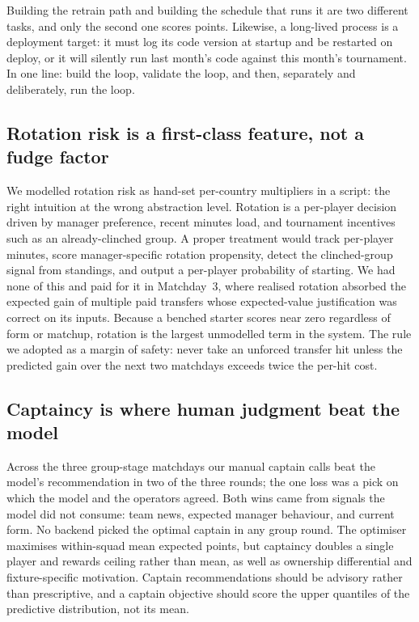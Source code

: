 Building the retrain path and building the schedule that runs it are
two different tasks, and only the second one scores points. Likewise,
a long-lived process is a deployment target: it must log its code
version at startup and be restarted on deploy, or it will silently run
last month's code against this month's tournament. In one line: build
the loop, validate the loop, and then, separately and deliberately,
run the loop.

\subsection{Rotation risk is a first-class feature, not a fudge
factor}
\label{sec:lessons-rotation}

We modelled rotation risk as hand-set per-country multipliers in a
script: the right intuition at the wrong abstraction level. Rotation
is a per-player decision driven by manager preference, recent minutes
load, and tournament incentives such as an already-clinched group. A
proper treatment would track per-player minutes, score
manager-specific rotation propensity, detect the clinched-group signal
from standings, and output a per-player probability of starting. We
had none of this and paid for it in Matchday~3, where realised
rotation absorbed the expected gain of multiple paid transfers whose
expected-value justification was correct on its inputs. Because a
benched starter scores near zero regardless of form or matchup,
rotation is the largest unmodelled term in the system. The rule we
adopted as a margin of safety: never take an unforced transfer hit
unless the predicted gain over the next two matchdays exceeds twice
the per-hit cost.

\subsection{Captaincy is where human judgment beat the model}
\label{sec:lessons-captaincy}

Across the three group-stage matchdays our manual captain calls beat
the model's recommendation in two of the three rounds; the one loss
was a pick on which the model and the operators agreed. Both wins came
from signals the model did not consume: team news, expected manager
behaviour, and current form. No backend picked the optimal captain in
any group round. The optimiser maximises within-squad mean expected
points, but captaincy doubles a single player and rewards ceiling
rather than mean, as well as ownership differential and
fixture-specific motivation. Captain recommendations should be
advisory rather than prescriptive, and a captain objective should
score the upper quantiles of the predictive distribution, not its
mean.

